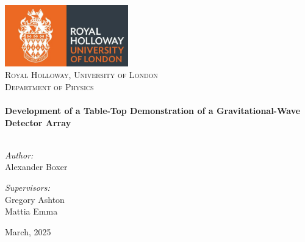 
\begin{titlepage}

\vbox{ }

\vbox{ }

\begin{center}

\includegraphics[width=0.4\textwidth]{images/logo.jpg}\\[1cm]
\textsc{\LARGE Royal Holloway, University of London}\\[1.5cm]
\textsc{\Large Department of Physics}\\[0.5cm]

\vbox{ }
\HRule \\[0.4cm]
{ \huge \bfseries Development of a Table-Top Demonstration of a Gravitational-Wave Detector Array}\\[0.4cm]
\HRule \\[1.5cm]
\begin{minipage}{0.4\textwidth}
\begin{flushleft} \large
\emph{Author:}\\
Alexander Boxer
\end{flushleft}
\end{minipage}
\begin{minipage}{0.4\textwidth}
\begin{flushright} \large
\emph{Supervisors:} \\
Gregory Ashton \\
Mattia Emma
\end{flushright}
\end{minipage}

\vfill
{\large March, 2025}
\end{center}
\end{titlepage}
\restoregeometry